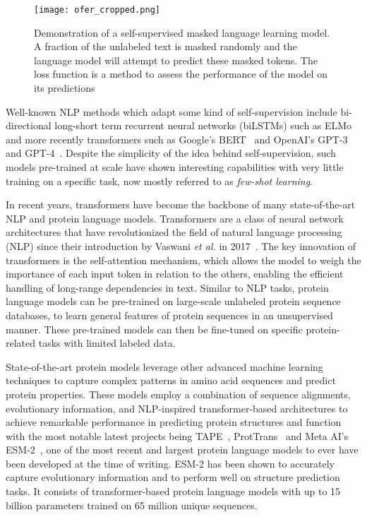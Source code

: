 \begin{figure}[h]
    \centering
    \texttt{[image: ofer\_cropped.png]}
    \caption{Demonstration of a self-supervised masked language learning model. A fraction of the unlabeled text is masked randomly and the language model will attempt to predict these masked tokens. The loss function is a method to assess the performance of the model on its predictions}
    \label{fig:ofer}
\end{figure}

Well-known NLP methods which adapt some kind of self-supervision include bi-directional long-short term recurrent neural networks (biLSTMs) such as ELMo~\cite{elmo} and more recently transformers such as Google's BERT~\cite{bert} and OpenAI's GPT-3~\cite{gpt3} and GPT-4~\cite{gpt4}. Despite the simplicity of the idea behind self-supervision, such models pre-trained at scale have shown interesting capabilities with very little training on a specific task, now mostly referred to as \textit{few-shot learning}. 

In recent years, transformers have become the backbone of many state-of-the-art NLP and protein language models. Transformers are a class of neural network architectures that have revolutionized the field of natural language processing (NLP) since their introduction by Vaswani \textit{et al.} in 2017~\cite{transfor}. The key innovation of transformers is the self-attention mechanism, which allows the model to weigh the importance of each input token in relation to the others, enabling the efficient handling of long-range dependencies in text. Similar to NLP tasks, protein language models can be pre-trained on large-scale unlabeled protein sequence databases, to learn general features of protein sequences in an unsupervised manner. These pre-trained models can then be fine-tuned on specific protein-related tasks with limited labeled data.

State-of-the-art protein models leverage other advanced machine learning techniques to capture complex patterns in amino acid sequences and predict protein properties. These models employ a combination of sequence alignments, evolutionary information, and NLP-inspired transformer-based architectures to achieve remarkable performance in predicting protein structures and function with the most notable latest projects being TAPE~\cite{tape}, ProtTrans~\cite{prottrans} and Meta AI's ESM-2~\cite{esm2}, one of the most recent and largest protein language models to ever have been developed at the time of writing. ESM-2 has been shown to accurately capture evolutionary information and to perform well on structure prediction tasks. It consists of transformer-based protein language models with up to 15 billion parameters trained on 65 million unique sequences.

